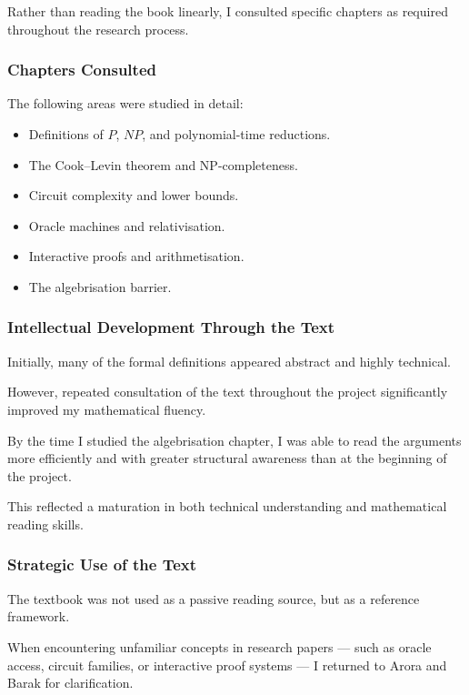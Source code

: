 \documentclass[12pt]{article}
\begin{document}
Rather than reading the book linearly, I consulted specific chapters as required throughout the research process.

\subsubsection*{Chapters Consulted}

The following areas were studied in detail:

\begin{itemize}
\item Definitions of $P$, $NP$, and polynomial-time reductions.
\item The Cook–Levin theorem and NP-completeness.
\item Circuit complexity and lower bounds.
\item Oracle machines and relativisation.
\item Interactive proofs and arithmetisation.
\item The algebrisation barrier.
\end{itemize}

\subsubsection*{Intellectual Development Through the Text}

Initially, many of the formal definitions appeared abstract and highly technical.

However, repeated consultation of the text throughout the project significantly improved my mathematical fluency.

By the time I studied the algebrisation chapter, I was able to read the arguments more efficiently and with greater structural awareness than at the beginning of the project.

This reflected a maturation in both technical understanding and mathematical reading skills.

\subsubsection*{Strategic Use of the Text}

The textbook was not used as a passive reading source, but as a reference framework.

When encountering unfamiliar concepts in research papers --- such as oracle access, circuit families, or interactive proof systems --- I returned to Arora and Barak for clarification.
\end{document}

